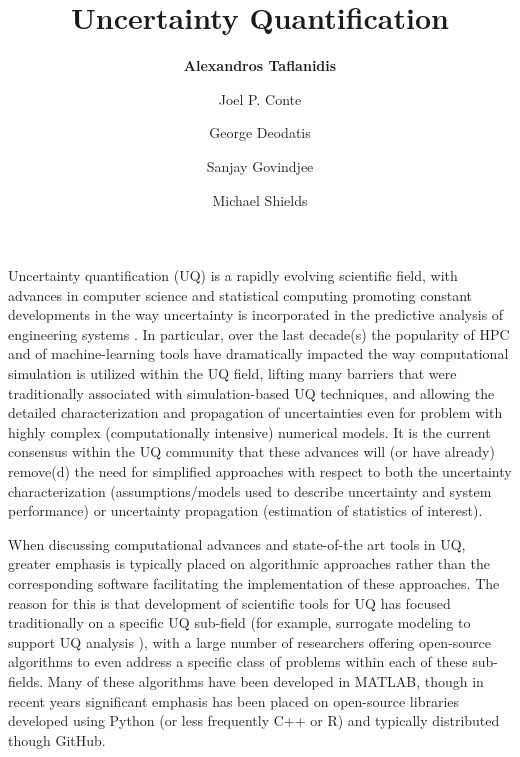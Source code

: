 %
%
%


\title{Uncertainty Quantification}
\author{
    \textbf{Alexandros Taflanidis}
    \and Joel P. Conte
    \and George Deodatis
    \and Sanjay Govindjee
    \and Michael Shields}
\tocauthor{}
%
%
\maketitle
\label{chapter:uq}

Uncertainty quantification (UQ) is a rapidly evolving scientific field, with advances in computer science and statistical computing promoting constant developments in the way uncertainty is incorporated in the predictive analysis of engineering systems \citep{smith2013uncertainty}. In particular, over the last decade(s) the popularity of HPC and of machine-learning tools have dramatically impacted the way computational simulation is utilized within the UQ field, lifting many barriers that were traditionally associated with simulation-based UQ techniques, and allowing the detailed characterization and propagation of uncertainties even for problem with highly complex (computationally intensive) numerical models. It is the current consensus within the UQ community that these advances will (or have already) remove(d) the need for simplified approaches with respect to both the uncertainty characterization (assumptions/models used to describe uncertainty and system performance) or uncertainty propagation (estimation of statistics of interest). 

When discussing computational advances and state-of-the art tools in UQ, greater emphasis is typically placed on algorithmic approaches rather than the corresponding software facilitating the implementation of these approaches. The reason for this is that development of scientific tools for UQ has focused traditionally on a specific UQ sub-field (for example, surrogate modeling to support UQ analysis \citep{lophaven2002dacea,gorissen2010surrogate}), with a large number of researchers \citep[e.g.,][]{bect2017bayesian,clement2018methods} offering open-source algorithms to even address a specific class of problems within each of these sub-fields. Many of these algorithms have been developed in MATLAB, though in recent years significant emphasis has been placed on open-source libraries developed using Python (or less frequently C++ or R) and typically distributed though GitHub.    

